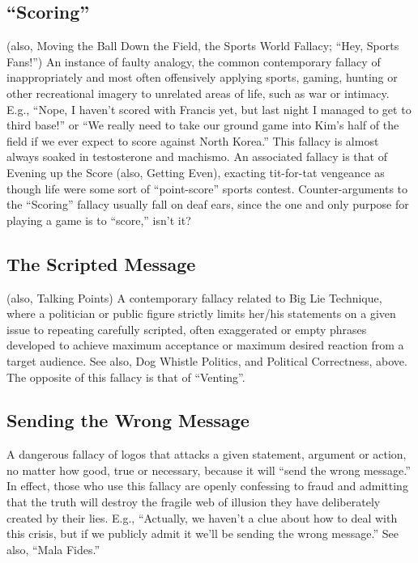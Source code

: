 \documentclass[10pt,a4paper,british]{article}
\begin{document}
\begin{multicols}{2}
    \subsection{``Scoring''} (also, Moving the Ball Down the Field, the Sports
    World Fallacy; ``Hey, Sports Fans!'') An instance of faulty analogy, the
    common contemporary fallacy of inappropriately and most often offensively
    applying sports, gaming, hunting or other recreational imagery to unrelated
    areas of life, such as war or intimacy. E.g., ``Nope, I haven't scored with
    Francis yet, but last night I managed to get to third base!''  or ``We
    really need to take our ground game into Kim's half of the field if we ever
    expect to score against North Korea.'' This fallacy is almost always soaked
    in testosterone and machismo. An associated fallacy is that of Evening up
    the Score (also, Getting Even), exacting tit{-}for{-}tat vengeance as
    though life were some sort of ``point{-}score'' sports contest.
    Counter{-}arguments to the ``Scoring'' fallacy usually fall on deaf ears,
    since the one and only purpose for playing a game is to ``score,'' isn't it?

    \subsection{The Scripted Message} (also, Talking Points)  A contemporary
    fallacy related to Big Lie Technique, where a politician or public figure
    strictly limits her/his statements on a given issue to repeating carefully
    scripted, often exaggerated or empty phrases developed to achieve maximum
    acceptance or maximum desired reaction from a target audience. See also,
    Dog Whistle Politics, and Political Correctness, above. The opposite of
    this fallacy is that of ``Venting''.

    \subsection{Sending the Wrong Message} A dangerous fallacy of logos that
    attacks a given statement, argument or action, no matter how good, true or
    necessary, because it will ``send the wrong message.'' In effect, those who
    use this fallacy are openly confessing to fraud and admitting that the
    truth will destroy the fragile web of illusion they have deliberately
    created by their lies. E.g., ``Actually, we haven't a clue about how to
    deal with this crisis, but if we publicly admit it we'll be sending the
    wrong message.'' See also, ``Mala Fides.'' 


\end{multicols}
\end{document}
